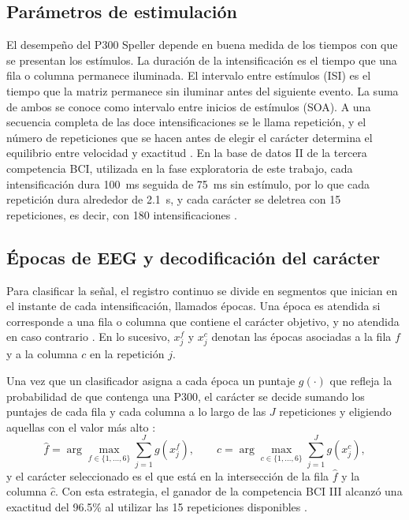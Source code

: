 \subsection{Parámetros de estimulación}

El desempeño del P300 Speller depende en buena medida de los tiempos con que se presentan los
estímulos. La duración de la intensificación es el tiempo que una fila o columna permanece
iluminada. El intervalo entre estímulos (ISI) es el tiempo que la matriz permanece sin iluminar
antes del siguiente evento. La suma de ambos se conoce como intervalo entre inicios de estímulos
(SOA). A una secuencia completa de las doce intensificaciones se le llama repetición, y el número
de repeticiones que se hacen antes de elegir el carácter determina el equilibrio entre velocidad y
exactitud \cite{krusienski2008}. En la base de datos II de la tercera competencia BCI, utilizada
en la fase exploratoria de este trabajo, cada intensificación dura 100~ms seguida de 75~ms sin
estímulo, por lo que cada repetición dura alrededor de 2.1~s, y cada carácter se deletrea con 15
repeticiones, es decir, con 180 intensificaciones \cite{blankertz2006}.

\subsection{Épocas de EEG y decodificación del carácter}

Para clasificar la señal, el registro continuo se divide en segmentos que inician en el instante
de cada intensificación, llamados épocas. Una época es atendida si corresponde a una fila o
columna que contiene el carácter objetivo, y no atendida en caso contrario \cite{contreras2021}. En
lo sucesivo, $x^{f}_{j}$ y $x^{c}_{j}$ denotan las épocas asociadas a la fila $f$ y a la columna $c$
en la repetición $j$.

Una vez que un clasificador asigna a cada época un puntaje $g(\cdot)$ que refleja la probabilidad
de que contenga una P300, el carácter se decide sumando los puntajes de cada fila y cada columna a
lo largo de las $J$ repeticiones y eligiendo aquellas con el valor más alto \cite{rakotomamonjy2008}:
\begin{equation}
\hat{f} = \arg\max_{f\in\{1,\dots,6\}} \sum_{j=1}^{J} g\!\left(x^{f}_{j}\right), \qquad
\hat{c} = \arg\max_{c\in\{1,\dots,6\}} \sum_{j=1}^{J} g\!\left(x^{c}_{j}\right),
\label{eq:decodificacion}
\end{equation}
y el carácter seleccionado es el que está en la intersección de la fila $\hat{f}$ y la
columna $\hat{c}$. Con esta estrategia, el ganador de la competencia BCI III
alcanzó una exactitud del 96.5\% al utilizar las 15 repeticiones disponibles
\cite{rakotomamonjy2008}.

